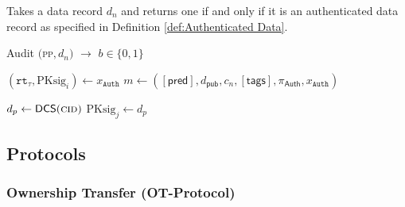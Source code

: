 Takes a data record \(d_{n}\) and returns one if and only if it is an authenticated data record as specified in Definition \ref{def:Authenticated Data}.

\begin{algorithm}
\caption{\textsf{Audit} $\big($\textsc{pp}$, d_n  \big)$ $\rightarrow$ $b \in \{0, 1\}$}\label{alg:Audit}
\begin{algorithmic}[1]
\State $(\texttt{rt}_\tau, \text{PKsig}_{i}) \gets x_\texttt{Auth}$
\State $m \gets ([\textsf{pred}], d_{\mathsf{pub}}, c_{n}, [\textsf{tags}], \pi_{\textsf{Auth}}, x_\texttt{Auth})$

    \State {}
\EndIf

    \State {}
\EndIf

    \State {}
\EndIf

    \State $d_p \gets \mathsf{DCS}(\textsc{cid})$
    \State $\text{PKsig}_{j} \gets d_p$
                \State {}
            \EndIf
    \EndIf
\EndWhile
\State {}
\end{algorithmic}
\end{algorithm}

\newpage

\subsection{Protocols}
\label{sec:Zupply-Protocols}

\subsubsection{Ownership Transfer (\textsf{OT-Protocol})}
\label{sec:Ownership Transfer}

